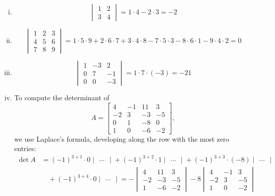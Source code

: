 \begin{example}
\begin{enumerate}[(i)]
		\item \[ \begin{vmatrix} 1 & 2 \\ 3 & 4 \end{vmatrix} = 1 \cdot 4 - 2 \cdot 3 = -2 \]
		\item \[ \begin{vmatrix} 1 & 2 & 3 \\ 4 & 5 & 6 \\ 7 & 8 & 9 \end{vmatrix} = 1 \cdot 5 \cdot 9 + 2 \cdot 6 \cdot 7 + 3 \cdot 4 \cdot 8 - 7 \cdot 5 \cdot 3 - 8 \cdot 6 \cdot 1 - 9 \cdot 4 \cdot 2 = 0 \]
		\item \[ \begin{vmatrix} 1 & -3 & 2 \\ 0 & 7 & -1 \\ 0 & 0 & -3 \end{vmatrix} = 1 \cdot 7 \cdot (-3) = -21 \]
		\item To compute the determinant of 
\[ A = \begin{bmatrix} 4 & -1 & 11 & 3  \\ -2 & 3 & -3 & -5 \\ 
0 & 1 & -8 & 0 \\ 1 & 0 & -6 & -2 \end{bmatrix}, \]
we use Laplace's formula, developing along the row with the most zero entries:
\begin{equation*}
\begin{split}
\det A 
& = (-1)^{3+1} \cdot 0 \begin{vmatrix} \ldots \end{vmatrix}
+ (-1)^{3+2} \cdot 1 \begin{vmatrix} \ldots \end{vmatrix}
+ (-1)^{3+3} \cdot (-8) \begin{vmatrix} \ldots \end{vmatrix} \\
& \quad + (-1)^{3+4} \cdot 0 \begin{vmatrix} \ldots \end{vmatrix} 
= - \begin{vmatrix} 4 & 11 & 3 \\ -2 & -3 & -5 \\ 1 & -6 & -2 \end{vmatrix}
- 8 \begin{vmatrix} 4 & -1 & 3 \\ -2 & 3 & -5 \\ 1 & 0 & -2 \end{vmatrix} \\ 

\end{split}
\end{equation*}
\end{enumerate}
\end{example}
